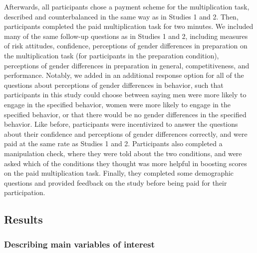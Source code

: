 \documentclass[letterpaper, nobind]{templates/ociamthesis}
\begin{document}
Afterwards, all participants chose a payment scheme for the multiplication task, described and counterbalanced in the same way as in Studies 1 and 2. Then, participants completed the paid multiplication task for two minutes. We included many of the same follow-up questions as in Studies 1 and 2, including measures of risk attitudes, confidence, perceptions of gender differences in preparation on the multiplication task (for participants in the preparation condition), perceptions of gender differences in preparation in general, competitiveness, and performance. Notably, we added in an additional response option for all of the questions about perceptions of gender differences in behavior, such that participants in this study could choose between saying men were more likely to engage in the specified behavior, women were more likely to engage in the specified behavior, or that there would be no gender differences in the specified behavior. Like before, participants were incentivized to answer the questions about their confidence and perceptions of gender differences correctly, and were paid at the same rate as Studies 1 and 2. Participants also completed a manipulation check, where they were told about the two conditions, and were asked which of the conditions they thought was more helpful in boosting scores on the paid multiplication task. Finally, they completed some demographic questions and provided feedback on the study before being paid for their participation.

\hypertarget{results-2}{%
\subsection{Results}\label{results-2}}

\hypertarget{describing-main-variables-of-interest-2}{%
\subsubsection{Describing main variables of interest}\label{describing-main-variables-of-interest-2}}
\end{document}
